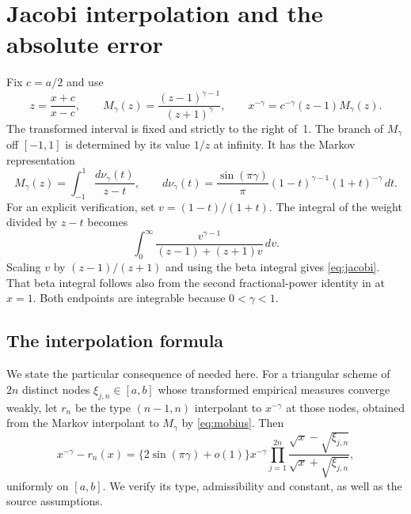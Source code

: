 \documentclass[11pt]{article}
\begin{document}
\section{Jacobi interpolation and the absolute error}

Fix $c=a/2$ and use
\begin{equation}\label{eq:mobius}
 z=\frac{x+c}{x-c},\qquad
 M_\gamma(z)=\frac{(z-1)^{\gamma-1}}{(z+1)^\gamma},\qquad
 x^{-\gamma}=c^{-\gamma}(z-1)M_\gamma(z).
\end{equation}
The transformed interval is fixed and strictly to the right of~1.
The branch of $M_\gamma$ off $[-1,1]$ is determined by its value $1/z$
at infinity. It has the Markov representation
\begin{equation}\label{eq:jacobi}
 M_\gamma(z)=\int_{-1}^1\frac{d\nu_\gamma(t)}{z-t},\qquad
 d\nu_\gamma(t)=\frac{\sin(\pi\gamma)}{\pi}
              (1-t)^{\gamma-1}(1+t)^{-\gamma}\,dt.
\end{equation}
For an explicit verification, set $v=(1-t)/(1+t)$. The integral of the
weight divided by $z-t$ becomes
\[
 \int_0^\infty\frac{v^{\gamma-1}}{(z-1)+(z+1)v}\,dv.
\]
Scaling $v$ by $(z-1)/(z+1)$ and using the beta integral gives
\eqref{eq:jacobi}. That beta integral follows also from the second
fractional-power identity in \cite[equation~(3.5)]{BH} at $x=1$.
Both endpoints are integrable because $0<\gamma<1$.

\subsection{The interpolation formula}

We state the particular consequence of \cite[Theorem~2]{BY} needed here.
For a triangular scheme of $2n$ distinct nodes $\xi_{j,n}\in[a,b]$ whose
transformed empirical measures converge weakly, let $r_n$ be the
type $(n-1,n)$ interpolant to $x^{-\gamma}$ at those nodes, obtained from
the Markov interpolant to $M_\gamma$ by \eqref{eq:mobius}.
Then
\begin{equation}\label{eq:interpolation-error}
 x^{-\gamma}-r_n(x)
 =\{2\sin(\pi\gamma)+o(1)\}x^{-\gamma}
      \prod_{j=1}^{2n}\frac{\sqrt x-\sqrt{\xi_{j,n}}}
                           {\sqrt x+\sqrt{\xi_{j,n}}},
\end{equation}
uniformly on $[a,b]$. We verify its type, admissibility and constant,
as well as the source assumptions.
\end{document}
